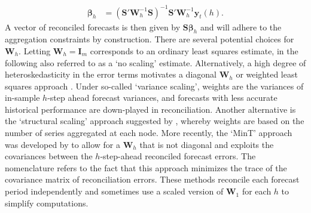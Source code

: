 \documentclass[a4paper,fleqn,11pt]{article}
\begin{document}
\begin{align}
\label{eq:reg}
\boldsymbol{\beta}_{h} &= \left(\textbf{S}'\textbf{W}_h^{-1}\textbf{S} \right)^{-1} \textbf{S}'\textbf{W}_h^{-1}\textbf{y}_t(h).
\end{align}
A vector of reconciled forecasts is then given by $\textbf{S} \boldsymbol{\beta}_{h}$ and will adhere to the aggregation constraints by construction. There are several potential choices for $\textbf{W}_h$. Letting $\textbf{W}_h = \textbf{I}_m$ corresponds to an ordinary least squares estimate, in the following also referred to as a `no scaling' estimate. Alternatively, a high degree of heteroskedasticity in the error terms motivates a diagonal $\textbf{W}_h$ or weighted least squares approach \citep{Hyndman2016}. Under so-called `variance scaling', weights are the variances of in-sample $h$-step ahead forecast variances, and forecasts with less accurate historical performance are down-played in reconciliation. Another alternative is the `structural scaling' approach suggested by \cite{Athanasopoulos2017}, whereby weights are based on the number of series aggregated at each node. More recently, the `MinT' approach was developed by \cite{Wickramasuriya2015} to allow for a $\textbf{W}_h$ that is not diagonal and exploits the covariances between the $h$-step-ahead reconciled forecast errors. The nomenclature refers to the fact that this approach minimizes the trace of the covariance matrix of reconciliation errors. These methods reconcile each forecast period independently and sometimes use a scaled version of $\textbf{W}_1$ for each $h$ to simplify computations.
\end{document}
